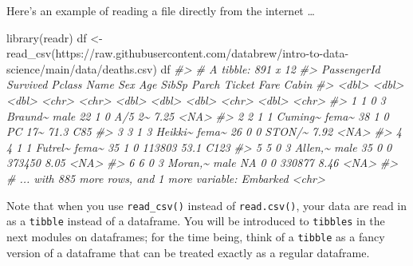 \documentclass[
]{book}
\newenvironment{Shaded}{\begin{snugshade}}{\end{snugshade}}
\newcommand{\CommentTok}[1]{\textcolor[rgb]{0.56,0.35,0.01}{\textit{#1}}}
\newcommand{\FunctionTok}[1]{\textcolor[rgb]{0.00,0.00,0.00}{#1}}
\newcommand{\NormalTok}[1]{#1}
\newcommand{\OtherTok}[1]{\textcolor[rgb]{0.56,0.35,0.01}{#1}}
\newcommand{\StringTok}[1]{\textcolor[rgb]{0.31,0.60,0.02}{#1}}
\begin{document}
Here's an example of reading a file directly from the internet \ldots{}

\begin{Shaded}
\begin{Highlighting}[]
\FunctionTok{library}\NormalTok{(readr)}
\NormalTok{df }\OtherTok{\textless{}{-}} \FunctionTok{read\_csv}\NormalTok{(}\StringTok{\textquotesingle{}https://raw.githubusercontent.com/databrew/intro{-}to{-}data{-}science/main/data/deaths.csv\textquotesingle{}}\NormalTok{)}
\NormalTok{df}
\CommentTok{\#\textgreater{} \# A tibble: 891 x 12}
\CommentTok{\#\textgreater{}   PassengerId Survived Pclass Name    Sex     Age SibSp Parch Ticket  Fare Cabin}
\CommentTok{\#\textgreater{}         \textless{}dbl\textgreater{}    \textless{}dbl\textgreater{}  \textless{}dbl\textgreater{} \textless{}chr\textgreater{}   \textless{}chr\textgreater{} \textless{}dbl\textgreater{} \textless{}dbl\textgreater{} \textless{}dbl\textgreater{} \textless{}chr\textgreater{}  \textless{}dbl\textgreater{} \textless{}chr\textgreater{}}
\CommentTok{\#\textgreater{} 1           1        0      3 Braund\textasciitilde{} male     22     1     0 A/5 2\textasciitilde{}  7.25 \textless{}NA\textgreater{} }
\CommentTok{\#\textgreater{} 2           2        1      1 Cuming\textasciitilde{} fema\textasciitilde{}    38     1     0 PC 17\textasciitilde{} 71.3  C85  }
\CommentTok{\#\textgreater{} 3           3        1      3 Heikki\textasciitilde{} fema\textasciitilde{}    26     0     0 STON/\textasciitilde{}  7.92 \textless{}NA\textgreater{} }
\CommentTok{\#\textgreater{} 4           4        1      1 Futrel\textasciitilde{} fema\textasciitilde{}    35     1     0 113803 53.1  C123 }
\CommentTok{\#\textgreater{} 5           5        0      3 Allen,\textasciitilde{} male     35     0     0 373450  8.05 \textless{}NA\textgreater{} }
\CommentTok{\#\textgreater{} 6           6        0      3 Moran,\textasciitilde{} male     NA     0     0 330877  8.46 \textless{}NA\textgreater{} }
\CommentTok{\#\textgreater{} \# ... with 885 more rows, and 1 more variable: Embarked \textless{}chr\textgreater{}}
\end{Highlighting}
\end{Shaded}

Note that when you use \texttt{read\_csv()} instead of \texttt{read.csv()}, your data are read in as a \texttt{tibble} instead of a dataframe. You will be introduced to \texttt{tibbles} in the next modules on dataframes; for the time being, think of a \texttt{tibble} as a fancy version of a dataframe that can be treated exactly as a regular dataframe.
\end{document}
